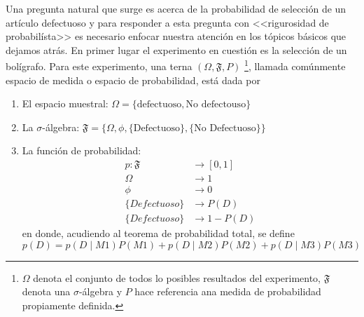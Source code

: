 \begin{Eje}
Una pregunta natural que surge es acerca de la probabilidad de selección de un artículo defectuoso y para responder a esta pregunta con <<rigurosidad de probabilísta>> es necesario enfocar nuestra atención en los tópicos básicos que dejamos atrás. En primer lugar el experimento en cuestión es la selección de un bolígrafo. Para este experimento, una terna $(\Omega, \mathfrak{F}, P)$ \footnote{$\Omega$ denota el conjunto de todos lo posibles resultados del experimento, $\mathfrak{F}$ denota una $\sigma$-álgebra y $P$ hace referencia ana medida de probabilidad propiamente definida.}, llamada comúnmente espacio de medida o espacio de probabilidad, está dada por
\begin{enumerate}
  \item El espacio muestral: $\Omega=\{\text{defectuoso}, \text{No defectouso}\}$
  \item La $\sigma$-álgebra: $\mathfrak{F}=\{\Omega, \phi, \{\text{Defectuoso}\}, \{\text{No Defectuoso}\}\}$
  \item La función de probabilidad:
  \begin{align*}
  p: \mathfrak{F} &\longrightarrow [0,1]\\
     \Omega &\longrightarrow 1\\
     \phi &\longrightarrow 0\\
     \{Defectuoso\}&\longrightarrow P(D)\\
     \{Defectuoso\}&\longrightarrow 1-P(D)
  \end{align*}
  en donde, acudiendo al teorema de probabilidad total, se define
  \begin{equation*}
  p(D)=p(D \mid M1)P(M1)+p(D \mid M2)P(M2)+p(D \mid M3)P(M3)
  \end{equation*}
\end{enumerate}


\end{Eje}
